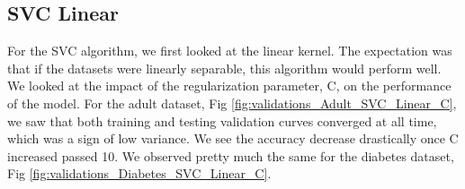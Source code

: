\documentclass[11pt, twocolumn]{article}
\begin{document}
    \subsection{SVC Linear}

    For the SVC algorithm, we first looked at the linear kernel. The expectation was that if the datasets were linearly separable, this algorithm would perform well. We looked at the impact of the regularization parameter, C, on the performance of the model. For the adult dataset, Fig \ref{fig:validations_Adult_SVC_Linear_C}, we saw that both training and testing validation curves converged at all time, which was a sign of low variance. We see the accuracy decrease drastically once C increased passed 10. We observed pretty much the same for the diabetes dataset, Fig \ref{fig:validations_Diabetes_SVC_Linear_C}.
\end{document}
